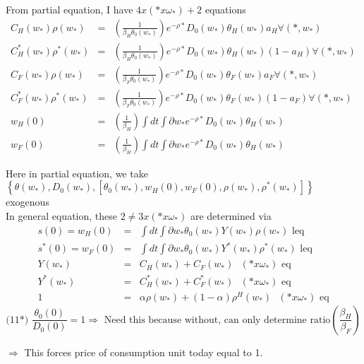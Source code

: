 \documentclass[]{article}
\begin{document}
From partial equation, I have $ 4x(*x\omega _*) + 2$ equations
\begin{eqnarray}
C_H(w_*) \rho (w_*) &=& \left(\frac{1}{\beta _H \theta _0(w_*)}\right) e^{-\rho *} D_0(w_*) \theta _H(w_*) a_H \forall (*, w_*)\\
C_H^*(w_*) \rho ^*(w_*) &=& \left(\frac{1}{\beta _H \theta _0(w_*)}\right) e^{-\rho *} D_0(w_*) \theta _H(w_*) (1-a_H) \forall (*, w_*)\\
C_F(w_*) \rho (w_*) &=& \left(\frac{1}{\beta _F \theta _0(w_*)}\right) e^{-\rho *} D_0(w_*) \theta _F(w_*) a_F \forall (*, w_*)\\
C_F^*(w_*) \rho ^*(w_*) &=& \left(\frac{1}{\beta _F \theta _0(w_*)}\right) e^{-\rho *} D_0(w_*) \theta _F(w_*) (1-a_F) \forall (*, w_*)\\
w_H(0) &=& \left(\frac{1}{\beta _H}\right)\int dt \int \partial w_* e^{-\rho *} D_0(w_*) \theta _H(w_*)\\
w_F(0) &=& \left(\frac{1}{\beta _H}\right)\int dt \int \partial w_* e^{-\rho *} D_0(w_*) \theta _H(w_*)
\end{eqnarray}

Here in partial equation, we take $\left\{ \theta (w_*), D_0(w_*), \left[ \theta _0(w_*), w_H(0), w_F(0), \rho (w_*), \rho ^*(w_*) \right]\right\}$ exogenous\\

In general equation, these $2 \neq 3 x(*x\omega _*)$ are determined via\\
\begin{eqnarray}
s(0) = w_H(0) &=& \int dt \int \partial w_* \theta _0(w_*) Y(w_*) \rho(w_*) \mbox{       leq}\\
s^*(0) = w_F(0) &=& \int dt \int \partial w_* \theta _0(w_*) Y^*(w_*) \rho ^*(w_*) \mbox{       leq}\\
Y(w_*) &=& C_H(w_*) + C_F(w_*)  \mbox{     } (*x\omega _*) \mbox{ eq}\\
Y^*(w_*) &=& C_H^*(w_*) + C_F^*(w_*)  \mbox{     } (*x\omega _*) \mbox{ eq}\\
1 &=& \alpha \rho (w_*) + (1-\alpha) \rho ^H (w_*) \mbox{     } (*x\omega _*) \mbox{ eq}
\end{eqnarray}
\begin{equation*}
\mbox{(11*) } \frac{\theta _0(0)}{D_0(0)} = 1 \Rightarrow \mbox{ Need this because without, can only determine ratio} \left(\frac{\beta_H}{\beta_F}\right)\tag{11*}
\end{equation*}

$\Rightarrow$ This forces price of consumption unit today equal to 1.\\
\end{document}
